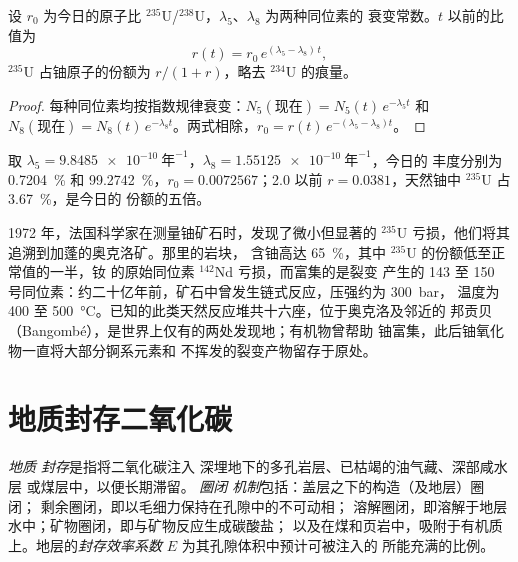 \begin{proposition}[过去的铀-235]\label{prop:b2:energy-geology:u235}
设 $r_0$ 为今日的原子比 $^{235}$U/$^{238}$U，$\lambda_5$、$\lambda_8$ 为两种同位素的
衰变常数。$t$ 以前的比值为
\begin{equation}
r(t) = r_0\,e^{(\lambda_5 - \lambda_8)\,t} ,
\label{eq:b2:energy-geology:u235}
\end{equation}
$^{235}$U 占铀原子的份额为 $r/(1 + r)$，略去
$^{234}$U 的痕量。
\end{proposition}

\begin{proof}
每种同位素均按指数规律衰变：$N_5(\text{现在}) = N_5(t)\,e^{-\lambda_5 t}$ 和 $N_8(\text{现在})
= N_8(t)\,e^{-\lambda_8 t}$。两式相除，$r_0 = r(t)\,e^{-(\lambda_5 - \lambda_8)t}$。
\end{proof}

取 $\lambda_5 = \qty{9.8485e-10}{\text{年}^{-1}}$，$\lambda_8 = \qty{1.55125e-10}{\text{年}^{-1}}$，今日的
丰度分别为 \qty{0.7204}{\percent} 和 \qty{99.2742}{\percent}，$r_0 = 0.0072567$；\qty{2.0}{\Ga}
以前 $r = 0.0381$，天然铀中 $^{235}$U 占 \qty{3.67}{\percent}，是今日的
份额的五倍。

\begin{history}[二十亿年前的天然反应堆]
1972 年，法国科学家在测量铀矿石时，发现了微小但显著的
$^{235}$U 亏损，他们将其追溯到加蓬的奥克洛矿。那里的岩块，
含铀高达 \qty{65}{\percent}，其中 $^{235}$U 的份额低至正常值的一半，钕
的原始同位素 $^{142}$Nd 亏损，而富集的是裂变
产生的 143 至 150 号同位素：约二十亿年前，矿石中曾发生链式反应，压强约为 \qty{300}{bar}，
温度为 400 至 \qty{500}{\celsius}。已知的此类天然反应堆共十六座，位于奥克洛及邻近的
邦贡贝（Bangombé），是世界上仅有的两处发现地；有机物曾帮助
铀富集，此后铀氧化物一直将大部分锕系元素和
不挥发的裂变产物留存于原处。
\end{history}

\section{地质封存二氧化碳}\label{sec:b2:energy-geology:ccs}

\begin{definition}\label{def:b2:energy-geology:ccs}
\emph{地质  封存}是指将二氧化碳注入
深埋地下的多孔岩层、已枯竭的油气藏、深部咸水层
或煤层中，以便长期滞留。\emph{ 圈闭
机制}包括：盖层之下的构造（及地层）圈闭；
剩余圈闭，即以毛细力保持在孔隙中的不可动相；
溶解圈闭，即溶解于地层水中；矿物圈闭，即与矿物反应生成碳酸盐；
以及在煤和页岩中，吸附于有机质上。地层的\emph{封存效率系数}
$E$ 为其孔隙体积中预计可被注入的
 所能充满的比例。
\end{definition}

